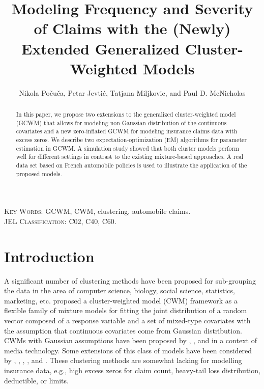 \documentclass[11pt,letterpaper]{article}
\numberwithin{equation}{section}
\numberwithin{equation}{section}
\numberwithin{equation}{section}
\begin{document}
\title{Modeling  Frequency and Severity of Claims with the (Newly) Extended Generalized  Cluster-Weighted Models}

\author{Nikola Po\v cu\v ca,  Petar Jevti\' c, Tatjana Miljkovic, and Paul D. McNicholas}

\maketitle
\doublespacing
\small

\begin{abstract}

In this paper, we propose two extensions to the generalized cluster-weighted model (GCWM) that allows for modeling non-Gaussian distribution of the continuous covariates and a new zero-inflated GCWM for modeling insurance claims data with excess zeros. We describe two expectation-optimization (EM) algorithms for parameter estimation in GCWM. A simulation study showed that both cluster models perform well for different settings in contrast to the existing mixture-based approaches. A real data set based on French automobile policies is used to illustrate the application of the proposed models.

\end{abstract}
\textsc{Key Words:} GCWM, CWM, clustering, automobile claims.\\
\textsc{JEL Classification:}  C02, C40, C60.\\
\section{Introduction}\label{sec:introduction}
A significant number of clustering methods have been proposed for sub-grouping the data in the area of computer science, biology, social science, statistics, marketing, etc. \cite{Ingrassia+Punzo+Vittadini+Minotti:2015} proposed a cluster-weighted model (CWM) framework as a flexible family of mixture models for fitting the joint distribution of a random vector composed of a response variable and a set of mixed-type covariates with the assumption that continuous covariates come from Gaussian distribution. CWMs with Gaussian assumptions have been proposed by \cite{Gershenfeld:1997}, \cite{Gershenfeld:Schoner+Metois:1999}, and \cite{Gershenfeld:1999} in a context of media technology. Some extensions of this class of models have been considered by \cite{Punzo+Ingrassia:2015}, \cite{Ingrassia+Minotti+Punzo:2014}, \cite{Ingrassia+Minotti+Vittadini:2012}, \cite{subedi13,subedi15}, and \cite{punzo17}. These clustering methods are somewhat lacking for modelling insurance data, e.g., high excess zeros for claim count, heavy-tail loss distribution, deductible, or limits.
\end{document}
